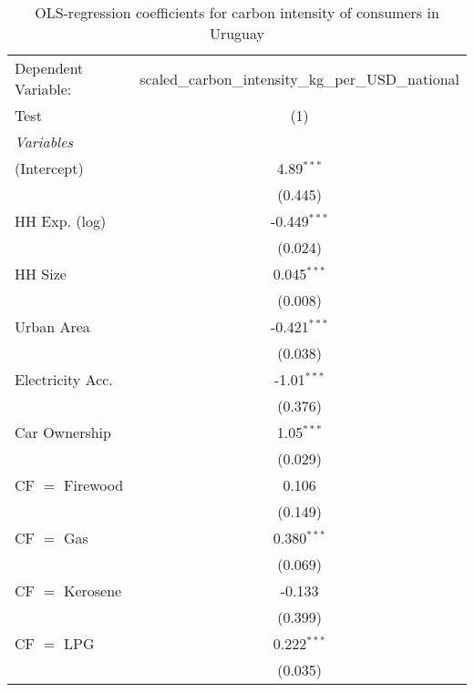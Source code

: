 
\begin{table}[htbp!]
   \centering
   \small
   \begin{adjustbox}{width = 1\textwidth, max height = 0.95\textheight, center}
      \begin{threeparttable}[b]
         \caption{\label{tab:OLS_1_URY} OLS-regression coefficients for carbon intensity of consumers in Uruguay}
         \begin{tabular}{lc}
            \tabularnewline \midrule \midrule
            Dependent Variable: & scaled\_carbon\_intensity\_kg\_per\_USD\_national\\        
            Test                & (1)\\  
            \midrule
            \emph{Variables}\\
            (Intercept)         & 4.89$^{***}$\\   
                                & (0.445)\\   
            HH Exp. (log)       & -0.449$^{***}$\\   
                                & (0.024)\\   
            HH Size             & 0.045$^{***}$\\   
                                & (0.008)\\   
            Urban Area          & -0.421$^{***}$\\   
                                & (0.038)\\   
            Electricity Acc.    & -1.01$^{***}$\\   
                                & (0.376)\\   
            Car Ownership       & 1.05$^{***}$\\   
                                & (0.029)\\   
            CF $=$ Firewood     & 0.106\\   
                                & (0.149)\\   
            CF $=$ Gas          & 0.380$^{***}$\\   
                                & (0.069)\\   
            CF $=$ Kerosene     & -0.133\\   
                                & (0.399)\\   
            CF $=$ LPG          & 0.222$^{***}$\\   
                                & (0.035)\\   

\end{tabular}
\end{threeparttable}
\end{adjustbox}
\end{table}
